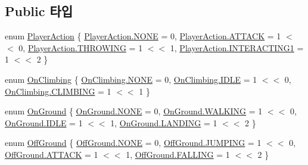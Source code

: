 \subsection*{Public 타입}
\begin{DoxyCompactItemize}
\item 
enum \mbox{\hyperlink{class_player_state_a2909421d9f22a750c1b0eacfc9bafb3d}{Player\+Action}} \{ \mbox{\hyperlink{class_player_state_a2909421d9f22a750c1b0eacfc9bafb3dab50339a10e1de285ac99d4c3990b8693}{Player\+Action.\+N\+O\+NE}} = 0, 
\mbox{\hyperlink{class_player_state_a2909421d9f22a750c1b0eacfc9bafb3dac6ddd0f72ff2fd344693b9ca8d483871}{Player\+Action.\+A\+T\+T\+A\+CK}} = 1 $<$$<$ 0, 
\mbox{\hyperlink{class_player_state_a2909421d9f22a750c1b0eacfc9bafb3da118050df28f155ec919c245101f050e5}{Player\+Action.\+T\+H\+R\+O\+W\+I\+NG}} = 1 $<$$<$ 1, 
\mbox{\hyperlink{class_player_state_a2909421d9f22a750c1b0eacfc9bafb3da0f85e9fa4c9d9011849fd3bfcae6a2c0}{Player\+Action.\+I\+N\+T\+E\+R\+A\+C\+T\+I\+N\+G1}} = 1 $<$$<$ 2
 \}
\item 
enum \mbox{\hyperlink{class_player_state_a16e115e2b4c8d0420119d6ff2fe8b3bc}{On\+Climbing}} \{ \mbox{\hyperlink{class_player_state_a16e115e2b4c8d0420119d6ff2fe8b3bcab50339a10e1de285ac99d4c3990b8693}{On\+Climbing.\+N\+O\+NE}} = 0, 
\mbox{\hyperlink{class_player_state_a16e115e2b4c8d0420119d6ff2fe8b3bcaa5daf7f2ebbba4975d61dab1c40188c7}{On\+Climbing.\+I\+D\+LE}} = 1 $<$$<$ 0, 
\mbox{\hyperlink{class_player_state_a16e115e2b4c8d0420119d6ff2fe8b3bcafc4db29e596cb9d0d1de3cdc00b982f1}{On\+Climbing.\+C\+L\+I\+M\+B\+I\+NG}} = 1 $<$$<$ 1
 \}
\item 
enum \mbox{\hyperlink{class_state_ab9eb1c1d81f1903b8486d1275e78b68e}{On\+Ground}} \{ \mbox{\hyperlink{class_state_ab9eb1c1d81f1903b8486d1275e78b68eab50339a10e1de285ac99d4c3990b8693}{On\+Ground.\+N\+O\+NE}} = 0, 
\mbox{\hyperlink{class_state_ab9eb1c1d81f1903b8486d1275e78b68ea606c114184493a665cf1f6a12fbab9d3}{On\+Ground.\+W\+A\+L\+K\+I\+NG}} = 1 $<$$<$ 0, 
\mbox{\hyperlink{class_state_ab9eb1c1d81f1903b8486d1275e78b68eaa5daf7f2ebbba4975d61dab1c40188c7}{On\+Ground.\+I\+D\+LE}} = 1 $<$$<$ 1, 
\mbox{\hyperlink{class_state_ab9eb1c1d81f1903b8486d1275e78b68ea7ab0a1cfd85cc3da16cd3e3ad7448524}{On\+Ground.\+L\+A\+N\+D\+I\+NG}} = 1 $<$$<$ 2
 \}
\item 
enum \mbox{\hyperlink{class_state_a7d945e793324c017a973205564cf1a56}{Off\+Ground}} \{ \mbox{\hyperlink{class_state_a7d945e793324c017a973205564cf1a56ab50339a10e1de285ac99d4c3990b8693}{Off\+Ground.\+N\+O\+NE}} = 0, 
\mbox{\hyperlink{class_state_a7d945e793324c017a973205564cf1a56a6de49bfda8068b7bc3b0c0e3d2e43134}{Off\+Ground.\+J\+U\+M\+P\+I\+NG}} = 1 $<$$<$ 0, 
\mbox{\hyperlink{class_state_a7d945e793324c017a973205564cf1a56ac6ddd0f72ff2fd344693b9ca8d483871}{Off\+Ground.\+A\+T\+T\+A\+CK}} = 1 $<$$<$ 1, 
\mbox{\hyperlink{class_state_a7d945e793324c017a973205564cf1a56a4f9d4539ac1e11a251e2afe022eba4e6}{Off\+Ground.\+F\+A\+L\+L\+I\+NG}} = 1 $<$$<$ 2
 \}
\end{DoxyCompactItemize}
